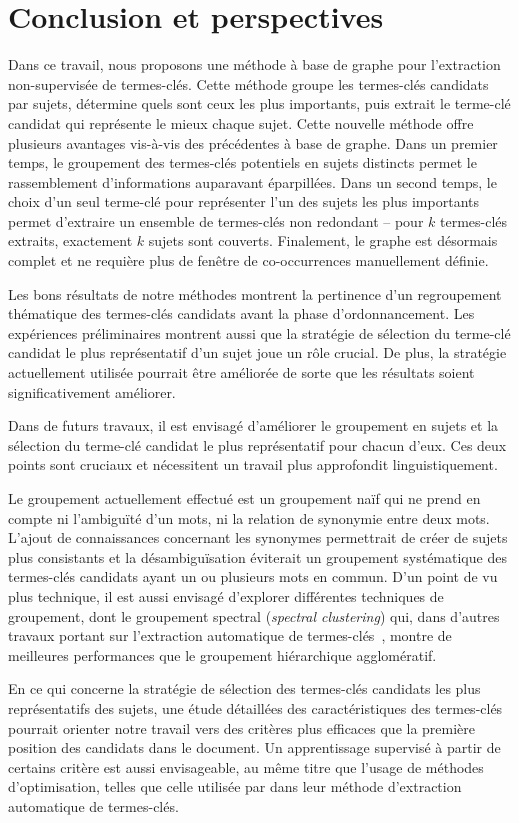 \section{Conclusion et perspectives}
\label{sec:conclusion_et_perspectives}
  Dans ce travail, nous proposons une méthode à base de graphe pour
  l'extraction non-supervisée de termes-clés. Cette méthode groupe les
  termes-clés candidats par sujets, détermine quels sont ceux les plus
  importants, puis extrait le terme-clé candidat qui représente le mieux chaque
  sujet. Cette nouvelle méthode offre plusieurs avantages vis-à-vis des
  précédentes à base de graphe. Dans un premier temps, le groupement des
  termes-clés potentiels en sujets distincts permet le rassemblement 
  d'informations auparavant éparpillées. Dans un second temps, le choix d'un
  seul terme-clé pour représenter l'un des sujets les plus importants permet
  d'extraire un ensemble de termes-clés non redondant -- pour $k$ termes-clés
  extraits, exactement $k$ sujets sont couverts. Finalement, le graphe est
  désormais complet et ne requière plus de fenêtre de co-occurrences
  manuellement définie.

  Les bons résultats de notre méthodes montrent la pertinence d'un regroupement
  thématique des termes-clés candidats avant la phase d'ordonnancement. Les
  expériences préliminaires montrent aussi que la stratégie de sélection du
  terme-clé candidat le plus représentatif d'un sujet joue un rôle crucial. De
  plus, la stratégie actuellement utilisée pourrait être améliorée de sorte que
  les résultats soient significativement améliorer.

  Dans de futurs travaux, il est envisagé d'améliorer le groupement en sujets et
  la sélection du terme-clé candidat le plus représentatif pour chacun d'eux.
  Ces deux points sont cruciaux et nécessitent un travail plus approfondit
  linguistiquement.
  
  Le groupement actuellement effectué est un groupement naïf qui ne prend en
  compte ni l'ambiguïté d'un mots, ni la relation de synonymie entre deux mots.
  L'ajout de connaissances concernant les synonymes permettrait de créer de
  sujets plus consistants et la désambiguïsation éviterait un groupement
  systématique des termes-clés candidats ayant un ou plusieurs mots en commun.
  D'un point de vu plus technique, il est aussi envisagé d'explorer différentes
  techniques de groupement, dont le groupement spectral (\textit{spectral
  clustering}) qui, dans d'autres travaux portant sur l'extraction
  automatique de termes-clés~\cite{liu2009keycluster}, montre de meilleures
  performances que le groupement hiérarchique agglomératif.

  En ce qui concerne la stratégie de sélection des termes-clés candidats les
  plus représentatifs des sujets, une étude détaillées des caractéristiques des
  termes-clés pourrait orienter notre travail vers des critères plus efficaces
  que la première position des candidats dans le document. Un apprentissage
  supervisé à partir de certains critère est aussi envisageable, au même titre
  que l'usage de méthodes d'optimisation, telles que celle utilisée par
   dans leur méthode d'extraction
  automatique de termes-clés.

